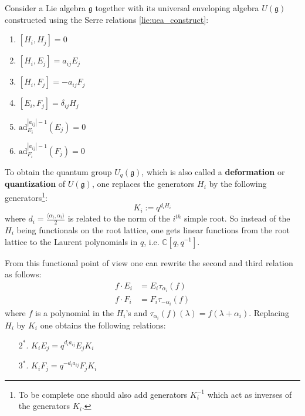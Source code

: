 	\begin{construct}
		Consider a Lie algebra $\mathfrak{g}$ together with its universal enveloping algebra $U(\mathfrak{g})$ constructed using the Serre relations \ref{lie:uea_construct}:
		\begin{enumerate}
			\item $[H_i, H_j] = 0$
        		\item $[H_i, E_j] = a_{ij}E_j$
        		\item $[H_i, F_j] = -a_{ij}F_j$
			\item $[E_i, F_j] = \delta_{ij}H_j$
        		\item $\text{ad}_{E_i}^{|a_{ij}|-1}(E_j) = 0$
        		\item $\text{ad}_{F_i}^{|a_{ij}|-1}(F_j) = 0$
		\end{enumerate}
		 To obtain the quantum group $U_q(\mathfrak{g})$, which is also called a \textbf{deformation} or \textbf{quantization} of $U(\mathfrak{g})$, one replaces the generators $H_i$ by the following generators\footnote{To be complete one should also add generators $K_i^{-1}$ which act as inverses of the generators $K_i$.}:
		\begin{equation}
			K_i := q^{d_iH_i}
		\end{equation}
		where $d_i = \frac{\langle\alpha_i, \alpha_i\rangle}{2}$ is related to the norm of the $i^{th}$ simple root. So instead of the $H_i$ being functionals on the root lattice, one gets linear functions from the root lattice to the Laurent polynomials in $q$, i.e. $\mathbb{C}[q, q^{-1}]$.
		
		From this functional point of view one can rewrite the second and third relation as follows:
		\begin{align*}
			f\cdot E_i &= E_i\tau_{\alpha_i}(f)\\
			f\cdot F_i &= F_i\tau_{-\alpha_i}(f)
		\end{align*}
		where $f$ is a polynomial in the $H_i$'s and $\tau_{\alpha_i}(f)(\lambda) = f(\lambda+\alpha_i)$. Replacing $H_i$ by $K_i$ one obtains the following relations:
		\begin{enumerate}
			\item[$2^*.$] $K_iE_j = q^{d_ia_{ij}}E_jK_i$
			\item[$3^*.$] $K_iF_j = q^{-d_ia_{ij}}F_jK_i$
		\end{enumerate}
		

\end{construct}
